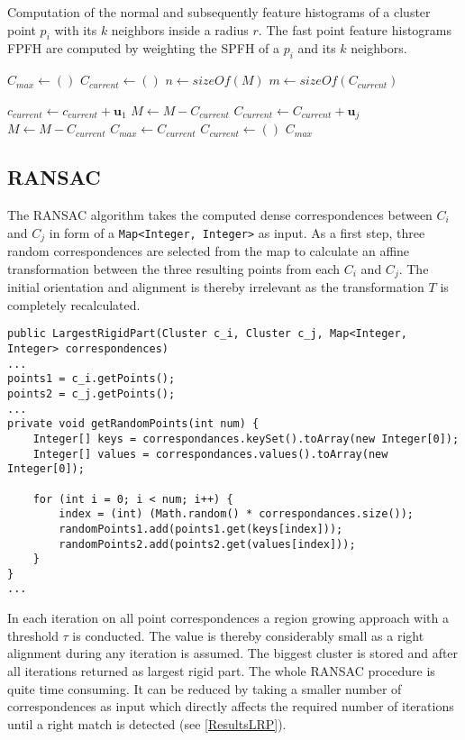 \begin{algorithm}[tbp]
	\caption{Computation of the normal and subsequently feature histograms of a cluster point $p_i$ with its $k$ neighbors inside a radius $r$. The fast point feature histograms FPFH are computed by weighting the SPFH of a $p_i$ and its $k$ neighbors.}
	
	\begin{algorithmic}[1]     %
		\label{featureHistograms}
		
		\State $\mathit{C_{max}} \gets ()$
		\State $\mathit{C_{current}} \gets ()$
		\State $n \gets \mathit{sizeOf}(M)$
		\State $m \gets \mathit{sizeOf}(C_{current})$
		
		\State $\mathit{c_{current}} \gets \mathit{c_{current}} + \boldsymbol{u}_1$
		\State $M \gets M - C_{current}$
		\State $C_{current} \gets C_{current} + \boldsymbol{u}_j$
		\EndIf
		\EndFor
		\EndFor
		\State $M \gets M - C_{current}$
		\State $C_{max} \gets C_{current}$
		\EndIf
		\State $C_{current} \gets ()$
		\EndWhile
		\State\Return $C_{max}$
		\EndProcedure	
	\end{algorithmic}
\end{algorithm}

\subsection{RANSAC}
\label{RANSAC}
The RANSAC algorithm takes the computed dense correspondences between $C_i$ and $C_j$ in form of a \texttt{Map<Integer, Integer>} as input. As a first step, three random correspondences are selected from the map to calculate an affine transformation between the three resulting points from each $C_i$ and $C_j$. The initial orientation and alignment is thereby irrelevant as the transformation $T$ is completely recalculated.
\begin{lstlisting}
public LargestRigidPart(Cluster c_i, Cluster c_j, Map<Integer, Integer> correspondences)
...
points1 = c_i.getPoints();
points2 = c_j.getPoints();
...
private void getRandomPoints(int num) {
	Integer[] keys = correspondances.keySet().toArray(new Integer[0]);
	Integer[] values = correspondances.values().toArray(new Integer[0]);

	for (int i = 0; i < num; i++) {
		index = (int) (Math.random() * correspondances.size());
		randomPoints1.add(points1.get(keys[index]));
		randomPoints2.add(points2.get(values[index]));
	}
}
...
\end{lstlisting}
In each iteration on all point correspondences a region growing approach with a threshold $\tau$ is conducted. The value is thereby considerably small as a right alignment during any iteration is assumed. The biggest cluster is stored and after all iterations returned as largest rigid part. The whole RANSAC procedure is quite time consuming. It can be reduced by taking a smaller number of correspondences as input which directly affects the required number of iterations until a right match is detected (see \ref{ResultsLRP}).

